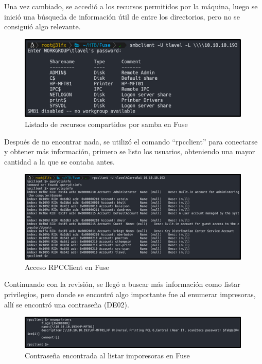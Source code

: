 Una vez cambiado, se accedió a los recursos permitidos por la máquina, luego se inició una búsqueda de información útil de entre los directorios, pero no se consiguió algo relevante.
\begin{figure}[H]
    \centering
    \includegraphics[width=0.99\textwidth]{imagenes/listsmbfuse.png}
    \caption{Listado de recursos compartidos por samba en Fuse}
\end{figure}
Después de no encontrar nada, se utilizó el comando “rpcclient” para conectarse y obtener más información, primero se listo los usuarios, obteniendo una mayor cantidad a la que se contaba antes.
\begin{figure}[H]
    \centering
    \includegraphics[width=0.99\textwidth]{imagenes/rpcclientfuse.png}
    \caption{Acceso RPCClient en Fuse}
\end{figure}
Continuando con la revisión, se llegó a buscar más información como listar privilegios, pero donde se encontró algo importante fue al enumerar impresoras, allí se encontró una contraseña (DE02).
\begin{figure}[H]
    \centering
    \includegraphics[width=0.99\textwidth]{imagenes/conimpfuse.png}
    \caption{Contraseña encontrada al listar imporesoras en Fuse}
\end{figure}
